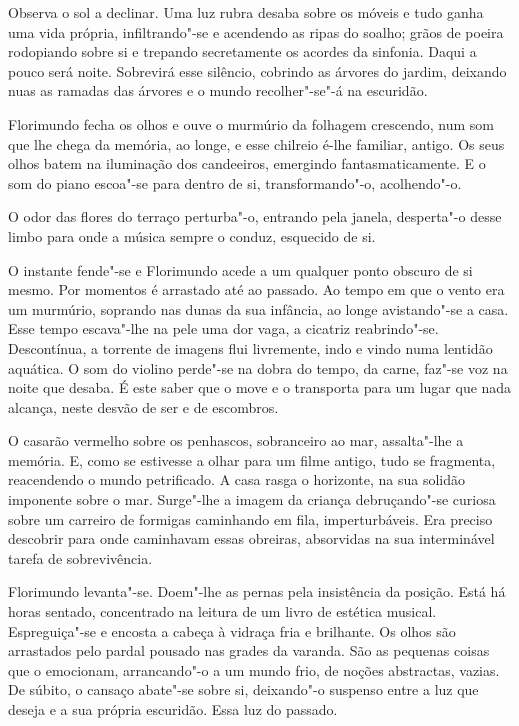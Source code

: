Observa o sol a declinar. Uma luz rubra desaba sobre os móveis e tudo
ganha uma vida própria, infiltrando"-se e acendendo as ripas do soalho;
grãos de poeira rodopiando sobre si e trepando secretamente os acordes
da sinfonia. Daqui a pouco será noite. Sobrevirá esse silêncio, cobrindo
as árvores do jardim, deixando nuas as ramadas das árvores e o mundo
recolher"-se"-á na escuridão.

Florimundo fecha os olhos e ouve o murmúrio da folhagem crescendo, num
som que lhe chega da memória, ao longe, e esse chilreio é-lhe familiar,
antigo. Os seus olhos batem na iluminação dos candeeiros, emergindo
fantasmaticamente. E o som do piano escoa"-se para dentro de si,
transformando"-o, acolhendo"-o.

O odor das flores do terraço perturba"-o, entrando pela janela,
desperta"-o desse limbo para onde a música sempre o conduz, esquecido de
si.

O instante fende"-se e Florimundo acede a um qualquer ponto obscuro de si
mesmo. Por momentos é arrastado até ao passado. Ao tempo em que o vento
era um murmúrio, soprando nas dunas da sua infância, ao longe
avistando"-se a casa. Esse tempo escava"-lhe na pele uma dor vaga, a
cicatriz reabrindo"-se. Descontínua, a torrente de imagens flui
livremente, indo e vindo numa lentidão aquática. O som do violino
perde"-se na dobra do tempo, da carne, faz"-se voz na noite que desaba. É
este saber que o move e o transporta para um lugar que nada alcança,
neste desvão de ser e de escombros.

O casarão vermelho sobre os penhascos, sobranceiro ao mar, assalta"-lhe a
memória. E, como se estivesse a olhar para um filme antigo, tudo se
fragmenta, reacendendo o mundo petrificado. A casa rasga o horizonte, na
sua solidão imponente sobre o mar. Surge"-lhe a imagem da criança
debruçando"-se curiosa sobre um carreiro de formigas caminhando em fila,
imperturbáveis. Era preciso descobrir para onde caminhavam essas
obreiras, absorvidas na sua interminável tarefa de sobrevivência.

Florimundo levanta"-se. Doem"-lhe as pernas pela insistência da posição.
Está há horas sentado, concentrado na leitura de um livro de estética
musical. Espreguiça"-se e encosta a cabeça à vidraça fria e brilhante. Os
olhos são arrastados pelo pardal pousado nas grades da varanda. São as
pequenas coisas que o emocionam, arrancando"-o a um mundo frio, de noções
abstractas, vazias. De súbito, o cansaço abate"-se sobre si, deixando"-o
suspenso entre a luz que deseja e a sua própria escuridão. Essa luz do
passado.

